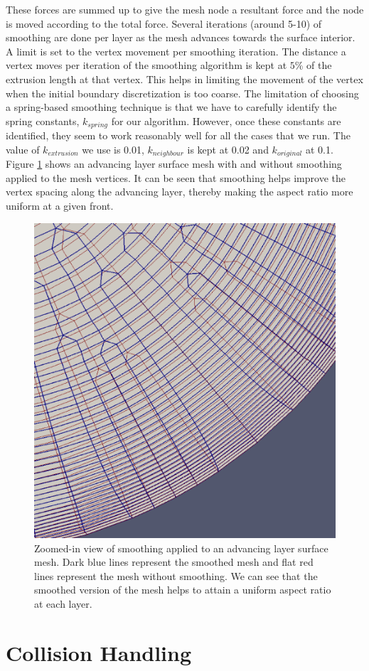 These forces are summed up to give the mesh node a resultant force and the node is moved according to the total force. Several iterations (around 5-10) of smoothing are done per layer as the mesh advances towards the surface interior. A limit is set to the vertex movement per smoothing iteration. The distance a vertex moves per iteration of the smoothing algorithm is kept at $5\%$ of the extrusion length at that vertex. This helps in limiting the movement of the vertex when the initial boundary discretization is too coarse. The limitation of choosing a spring-based smoothing technique is that we have to carefully identify the spring constants, $\mathit{k_{spring}}$ for our algorithm. However, once these constants are identified, they seem to work reasonably well for all the cases that we run. The value of $\mathit{k_{extrusion}}$ we use is 0.01, $k_{neighbour}$ is kept at 0.02 and $\mathit{k_{original}}$ at 0.1. Figure \ref{fig-smoothing-cylinder} shows an advancing layer surface mesh with and without smoothing applied to the mesh vertices. It can be seen that smoothing helps improve the vertex spacing along the advancing layer, thereby making the aspect ratio more uniform at a given front.

\begin{figure}
	\centering
	\includegraphics[width=0.4\linewidth]{img/m2/smoothing/smoothing-comparison-cylinder-cap.eps}
	\caption[Comparison of a surface mesh before and after smoothing is applied.]{Zoomed-in view of smoothing applied to an advancing layer surface mesh. Dark blue lines represent the smoothed mesh and flat red lines represent the mesh without smoothing. We can see that the smoothed version of the mesh helps to attain a uniform aspect ratio at each layer.}
	\label{fig-smoothing-cylinder}
\end{figure}

\section{Collision Handling}
\label{collisionHandling}

